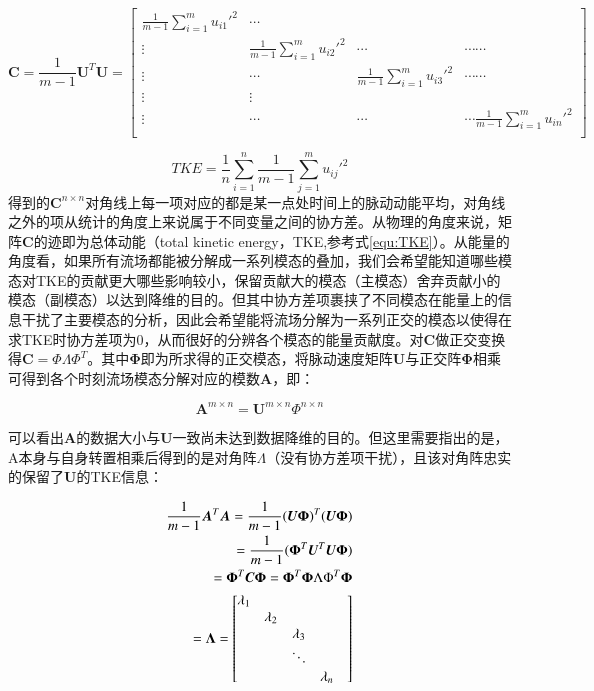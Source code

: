 $$
\bm C = \frac{1}{m-1}\bm U^{T}\bm U =
\begin{bmatrix}
\frac{1}{m-1}\sum_{i=1}^{m}{u_{i1}'}^2 & \cdots \\
\vdots & \frac{1}{m-1}\sum_{i=1}^{m}{u_{i2}'}^2 & \cdots & \cdots \cdots\\
\vdots & \cdots & \frac{1}{m-1}\sum_{i=1}^{m}{u_{i3}'}^2 & \cdots \cdots\\
\vdots & \vdots\\
\vdots & \cdots & \cdots & \cdots \frac{1}{m-1}\sum_{i=1}^{m}{u_{in}'}^2\\
\end{bmatrix}
\label{PODeny}
$$

\begin{equation}
TKE = \frac{1}{n}\sum_{i=1}^{n}\frac{1}{m-1}\sum_{j=1}^{m}{u_{ij}'}^2
\label{equ:TKE}
\end{equation}
得到的$\bm C^{n\times n}$对角线上每一项对应的都是某一点处时间上的脉动动能平均，对角线之外的项从统计的角度上来说属于不同变量之间的协方差。从物理的角度来说，矩阵$\bm C$的迹即为总体动能（total kinetic energy，TKE,参考式\ref{equ:TKE}）。从能量的角度看，如果所有流场都能被分解成一系列模态的叠加，我们会希望能知道哪些模态对TKE的贡献更大哪些影响较小，保留贡献大的模态（主模态）舍弃贡献小的模态（副模态）以达到降维的目的。但其中协方差项裹挟了不同模态在能量上的信息干扰了主要模态的分析，因此会希望能将流场分解为一系列正交的模态以使得在求TKE时协方差项为0，从而很好的分辨各个模态的能量贡献度。对$\bm C$做正交变换得$\bm C = \Phi\Lambda\Phi^{T}$。其中$\bm \Phi$即为所求得的正交模态，将脉动速度矩阵$\bm U$与正交阵$\bm \Phi$相乘可得到各个时刻流场模态分解对应的模数$\bm A$，即：

$$\bm A^{m\times n} = \bm U^{m\times n}\Phi^{n\times n}$$

可以看出$\bm A$的数据大小与$\bm U$一致尚未达到数据降维的目的。但这里需要指出的是，A本身与自身转置相乘后得到的是对角阵$\Lambda$（没有协方差项干扰），且该对角阵忠实的保留了$\bm U$的TKE信息：

\begin{align}
\frac{1}{m-1}\bm A^{T}\bm A = \frac{1}{m-1}(\bm U\bm \Phi)^{T}(\bm U\bm \Phi)\notag \\
= \frac{1}{m-1}(\bm \Phi^{T}\bm U^{T}\bm U\bm \Phi)\notag \\
=\bm\Phi^{T}\bm C\bm \Phi = \bm\Phi^{T}\bm\Phi\Lambda\Phi^{T}\bm \Phi\notag \\ 
= \bm \Lambda = 
\begin{bmatrix}
\lambda_{1} &   & &  &\\
	  & \lambda_{2} &  & &\\
	  &   & \lambda_{3}& &\\
	  &   &  \ddots &  &\\
	  &   &   &     \lambda_{n}   &
\end{bmatrix}
\end{align}

